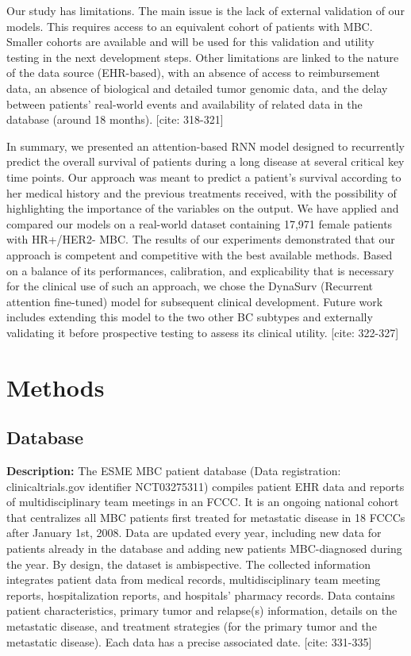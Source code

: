 \documentclass[a4paper,10pt]{article}
\begin{document}
Our study has limitations. The main issue is the lack of external validation of our models. This requires access to an equivalent cohort of patients with MBC. Smaller cohorts are available and will be used for this validation and utility testing in the next development steps. Other limitations are linked to the nature of the data source (EHR-based), with an absence of access to reimbursement data, an absence of biological and detailed tumor genomic data, and the delay between patients' real-world events and availability of related data in the database (around 18 months). [cite: 318-321]

In summary, we presented an attention-based RNN model designed to recurrently predict the overall survival of patients during a long disease at several critical key time points. Our approach was meant to predict a patient's survival according to her medical history and the previous treatments received, with the possibility of highlighting the importance of the variables on the output. We have applied and compared our models on a real-world dataset containing 17,971 female patients with HR+/HER2- MBC. The results of our experiments demonstrated that our approach is competent and competitive with the best available methods. Based on a balance of its performances, calibration, and explicability that is necessary for the clinical use of such an approach, we chose the DynaSurv (Recurrent attention fine-tuned) model for subsequent clinical development. Future work includes extending this model to the two other BC subtypes and externally validating it before prospective testing to assess its clinical utility. [cite: 322-327]

\section{Methods}

\subsection{Database}
\textbf{Description:} The ESME MBC patient database (Data registration: clinicaltrials.gov identifier NCT03275311) compiles patient EHR data and reports of multidisciplinary team meetings in an FCCC. It is an ongoing national cohort that centralizes all MBC patients first treated for metastatic disease in 18 FCCCs after January 1st, 2008. Data are updated every year, including new data for patients already in the database and adding new patients MBC-diagnosed during the year. By design, the dataset is ambispective. The collected information integrates patient data from medical records, multidisciplinary team meeting reports, hospitalization reports, and hospitals' pharmacy records. Data contains patient characteristics, primary tumor and relapse(s) information, details on the metastatic disease, and treatment strategies (for the primary tumor and the metastatic disease). Each data has a precise associated date. [cite: 331-335]
\end{document}
